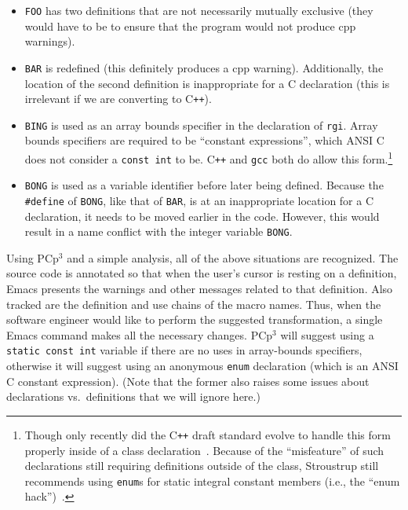 \documentclass{article}
\newcommand{\pcp}{\mbox{\textsf{PCp}$^3$}}
\newcommand{\Cpp}{\mbox{\textsf{cpp}}}
\newcommand{\CPP}{\mbox{C\texttt{++}}}
\newcommand{\C}{\mbox{C}}
\newcommand{\ppd}[1]{\texttt{\##1}}
\newcommand{\ie}{i.e.,}
\begin{document}
\begin{itemize}
\item \texttt{FOO} has two definitions that are not necessarily mutually
      exclusive (they would have to be to ensure that the program would
      not produce \Cpp{} warnings).
\item \texttt{BAR} is redefined (this definitely produces a \Cpp{}
      warning).  Additionally, the location of the second definition is
      inappropriate for a \C{} declaration (this is irrelevant if we
      are converting to \CPP{}).
\item \texttt{BING} is used as an array bounds specifier in the
      declaration of \texttt{rgi}.  Array bounds specifiers are required
      to be ``constant expressions'', which ANSI \C{} does not consider
      a \texttt{const int} to be.  \CPP{} and \texttt{gcc} both do allow
      this form.\footnote{Though only recently did the \CPP{} draft standard
      evolve to handle this form properly inside of a class
      declaration~\cite{CD2DraftStandard}.  Because of the
      ``misfeature'' of such declarations still requiring definitions
      outside of the class, Stroustrup still recommends using
      \texttt{enum}s for static integral constant members (\ie{} the
      ``enum hack'')~\cite[p.~249]{Stroustrup97}.}
\item \texttt{BONG} is used as a variable identifier before later being
      defined.  Because the \ppd{define} of \texttt{BONG}, like that
      of \texttt{BAR}, is at an inappropriate location for a \C{}
      declaration, it needs to be moved earlier in the code. However, this
      would result in a name conflict with the integer variable
      \texttt{BONG}.
\end{itemize}

\noindent Using \pcp{} and a simple analysis, all of the above
situations are recognized.  The source code is annotated so that when
the user's cursor is resting on a definition, Emacs presents the
warnings and other messages related to that definition.  Also tracked
are the definition and use chains of the macro names.  Thus, when the
software engineer would like to perform the suggested transformation, a
single Emacs command makes all the necessary changes.  \pcp{} will suggest
using a \texttt{static const int} variable if there are no uses in
array-bounds specifiers, otherwise it will suggest using an anonymous
\texttt{enum} declaration (which is an ANSI \C{} constant expression).
(Note that the former also raises some issues about declarations vs.\
definitions that we will ignore here.)
\end{document}
